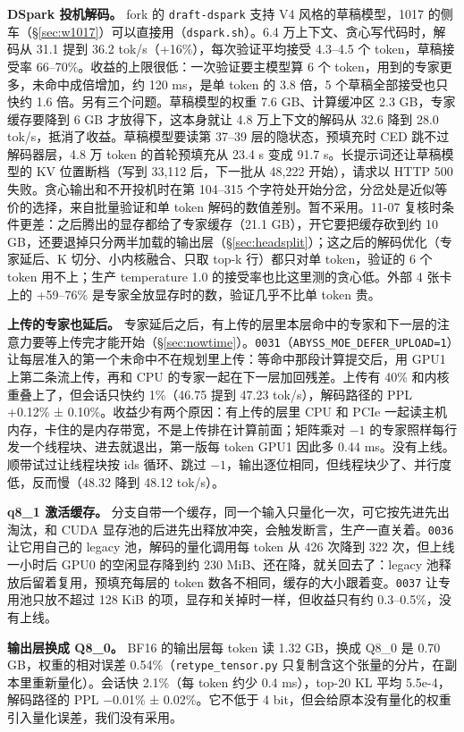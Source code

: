 \documentclass[11pt,a4paper]{article}
\newcommand{\code}[1]{\texttt{#1}}
\newcommand{\tps}{tok/s}
\begin{document}
\textbf{DSpark 投机解码。} fork 的 \code{draft-dspark} 支持 V4 风格的草稿模型，1017 的侧车（\S\ref{sec:w1017}）可以直接用（\code{dspark.sh}）。6.4 万上下文、贪心写代码时，解码从 31.1 提到 36.2 \tps{}（+16\%），每次验证平均接受 4.3--4.5 个 token，草稿接受率 66--70\%。收益的上限很低：一次验证要主模型算 6 个 token，用到的专家更多，未命中成倍增加，约 120 ms，是单 token 的 3.8 倍，5 个草稿全部接受也只快约 1.6 倍。另有三个问题。草稿模型的权重 7.6 GB、计算缓冲区 2.3 GB，专家缓存要降到 6 GB 才放得下，这本身就让 4.8 万上下文的解码从 32.6 降到 28.0 \tps{}，抵消了收益。草稿模型要读第 37--39 层的隐状态，预填充时 CED 跳不过解码器层，4.8 万 token 的首轮预填充从 23.4 s 变成 91.7 s。长提示词还让草稿模型的 KV 位置断档（写到 33,112 后，下一批从 48,222 开始），请求以 HTTP 500 失败。贪心输出和不开投机时在第 104--315 个字符处开始分岔，分岔处是近似等价的选择，来自批量验证和单 token 解码的数值差别。暂不采用。11-07 复核时条件更差：之后腾出的显存都给了专家缓存（21.1 GB），开它要把缓存砍到约 10 GB，还要退掉只分两半加载的输出层（\S\ref{sec:headsplit}）；这之后的解码优化（专家延后、K 切分、小内核融合、只取 top-k 行）都只对单 token，验证的 6 个 token 用不上；生产 temperature 1.0 的接受率也比这里测的贪心低。外部 4 张卡上的 +59--76\% 是专家全放显存时的数，验证几乎不比单 token 贵。

\textbf{上传的专家也延后。} 专家延后之后，有上传的层里本层命中的专家和下一层的注意力要等上传完才能开始（\S\ref{sec:nowtime}）。\code{0031}（\code{ABYSS\_MOE\_DEFER\_UPLOAD=1}）让每层准入的第一个未命中不在规划里上传：等命中那段计算提交后，用 GPU1 上第二条流上传，再和 CPU 的专家一起在下一层加回残差。上传有 40\% 和内核重叠上了，但会话只快约 1\%（46.75 提到 47.23 \tps{}），解码路径的 PPL +0.12\% ± 0.10\%。收益少有两个原因：有上传的层里 CPU 和 PCIe 一起读主机内存，卡住的是内存带宽，不是上传排在计算前面；矩阵乘对 $-1$ 的专家照样每行发一个线程块、进去就退出，第一版每 token GPU1 因此多 0.44 ms。没有上线。顺带试过让线程块按 ids 循环、跳过 $-1$，输出逐位相同，但线程块少了、并行度低，反而慢（48.32 降到 48.12 \tps{}）。

\textbf{q8\_1 激活缓存。} 分支自带一个缓存，同一个输入只量化一次，可它按先进先出淘汰，和 CUDA 显存池的后进先出释放冲突，会触发断言，生产一直关着。\code{0036} 让它用自己的 legacy 池，解码的量化调用每 token 从 426 次降到 322 次，但上线一小时后 GPU0 的空闲显存降到约 230 MiB、还在降，就关回去了：legacy 池释放后留着复用，预填充每层的 token 数各不相同，缓存的大小跟着变。\code{0037} 让专用池只放不超过 128 KiB 的项，显存和关掉时一样，但收益只有约 0.3--0.5\%，没有上线。

\textbf{输出层换成 Q8\_0。} BF16 的输出层每 token 读 1.32 GB，换成 Q8\_0 是 0.70 GB，权重的相对误差 0.54\%（\code{retype\_tensor.py} 只复制含这个张量的分片，在副本里重新量化）。会话快 2.1\%（每 token 约少 0.4 ms），top-20 KL 平均 5.5e-4，解码路径的 PPL $-$0.01\% ± 0.02\%。它不低于 4 bit，但会给原本没有量化的权重引入量化误差，我们没有采用。
\end{document}
